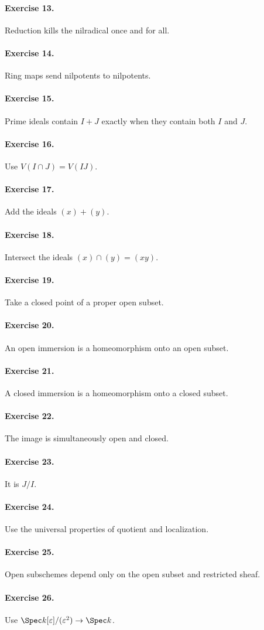 \paragraph{Exercise 13.} Reduction kills the nilradical once and for all.
\paragraph{Exercise 14.} Ring maps send nilpotents to nilpotents.
\paragraph{Exercise 15.} Prime ideals contain $I+J$ exactly when they contain both $I$ and $J$.
\paragraph{Exercise 16.} Use $V(I\cap J)=V(IJ)$.
\paragraph{Exercise 17.} Add the ideals $(x)+(y)$.
\paragraph{Exercise 18.} Intersect the ideals $(x)\cap(y)=(xy)$.
\paragraph{Exercise 19.} Take a closed point of a proper open subset.
\paragraph{Exercise 20.} An open immersion is a homeomorphism onto an open subset.
\paragraph{Exercise 21.} A closed immersion is a homeomorphism onto a closed subset.
\paragraph{Exercise 22.} The image is simultaneously open and closed.
\paragraph{Exercise 23.} It is $J/I$.
\paragraph{Exercise 24.} Use the universal properties of quotient and localization.
\paragraph{Exercise 25.} Open subschemes depend only on the open subset and restricted sheaf.
\paragraph{Exercise 26.} Use $\Spec k[\varepsilon]/(\varepsilon^2)\to\Spec k$.
